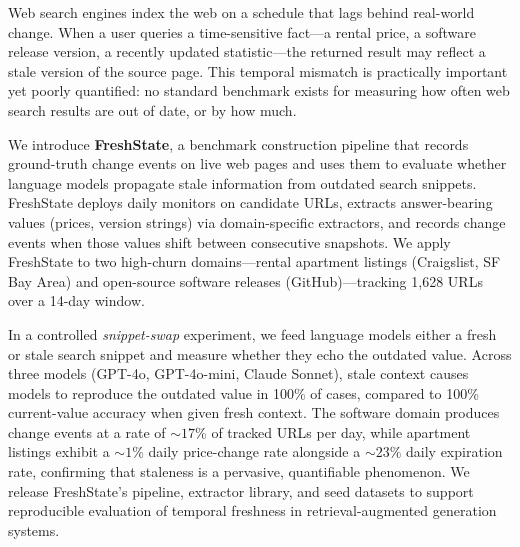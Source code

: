 Web search engines index the web on a schedule that lags behind real-world change.
When a user queries a time-sensitive fact---a rental price, a software release version,
a recently updated statistic---the returned result may reflect a stale version of the
source page. This temporal mismatch is practically important yet poorly quantified:
no standard benchmark exists for measuring how often web search results are out of
date, or by how much.

We introduce \textbf{FreshState}, a benchmark construction pipeline that records
ground-truth change events on live web pages and uses them to evaluate whether
language models propagate stale information from outdated search snippets.
FreshState deploys daily monitors on candidate URLs, extracts answer-bearing
values (prices, version strings) via domain-specific extractors, and records
change events when those values shift between consecutive snapshots.
We apply FreshState to two high-churn domains---rental apartment listings
(Craigslist, SF Bay Area) and open-source software releases (GitHub)---tracking
1,628 URLs over a 14-day window.

In a controlled \emph{snippet-swap} experiment, we feed language models either
a fresh or stale search snippet and measure whether they echo the outdated value.
Across three models (GPT-4o, GPT-4o-mini, Claude Sonnet), stale context causes
models to reproduce the outdated value in 100\% of cases, compared to
100\% current-value accuracy when given fresh context.
The software domain produces change events at a rate of ${\sim}17\%$ of tracked
URLs per day, while apartment listings exhibit a ${\sim}1\%$ daily price-change
rate alongside a ${\sim}23\%$ daily expiration rate, confirming that staleness is
a pervasive, quantifiable phenomenon. We release FreshState's pipeline, extractor
library, and seed datasets to support reproducible evaluation of temporal freshness
in retrieval-augmented generation systems.
